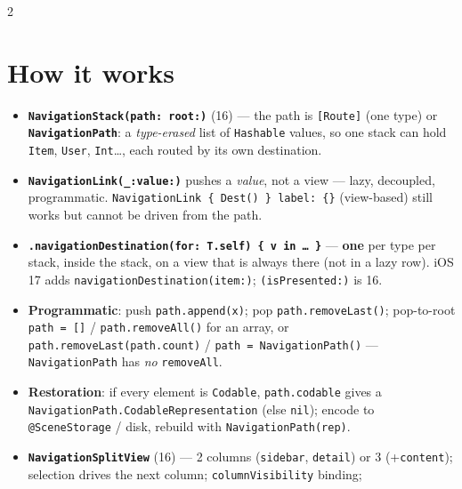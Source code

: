 \documentclass[8pt]{extarticle}
\begin{document}


\begin{multicols}{2}
\raggedright

\section{How it works}
\begin{itemize}
  \item \textbf{\texttt{NavigationStack(path:\,root:)}} (16) — the path is \texttt{[Route]} (one type) or
        \textbf{\texttt{NavigationPath}}: a \emph{type-erased} list of \texttt{Hashable} values, so one stack
        can hold \texttt{Item}, \texttt{User}, \texttt{Int}\ldots, each routed by its own destination.
  \item \textbf{\texttt{NavigationLink(\_:value:)}} pushes a \emph{value}, not a view — lazy, decoupled,
        programmatic. \texttt{NavigationLink \{ Dest() \} label: \{\}} (view-based) still works but cannot be
        driven from the path.
  \item \textbf{\texttt{.navigationDestination(for: T.self) \{ v in … \}}} — \textbf{one} per type per stack,
        inside the stack, on a view that is always there (not in a lazy row).
        iOS 17 adds \texttt{navigationDestination(item:)}; \texttt{(isPresented:)} is 16.
  \item \textbf{Programmatic}: push \texttt{path.append(x)}; pop \texttt{path.removeLast()};
        pop-to-root \texttt{path = []} / \texttt{path.removeAll()} for an array, or
        \texttt{path.removeLast(path.count)} / \texttt{path = NavigationPath()} — \texttt{NavigationPath}
        has \emph{no} \texttt{removeAll}.
  \item \textbf{Restoration}: if every element is \texttt{Codable}, \texttt{path.codable} gives a
        \texttt{NavigationPath.CodableRepresentation} (else \texttt{nil}); encode to \texttt{@SceneStorage}
        / disk, rebuild with \texttt{NavigationPath(rep)}.
  \item \textbf{\texttt{NavigationSplitView}} (16) — 2 columns (\texttt{sidebar}, \texttt{detail}) or 3
        (+\texttt{content}); selection drives the next column; \texttt{columnVisibility} binding;

\end{itemize}
\end{multicols}
\end{document}
